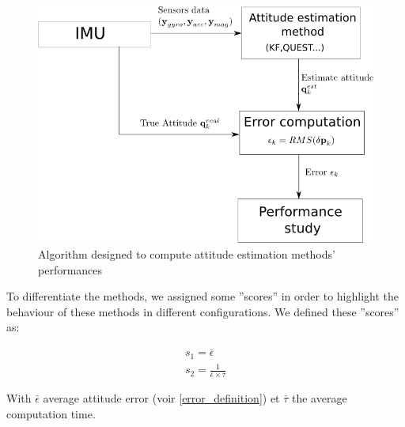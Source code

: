 \documentclass[conference]{IEEEtran}
\begin{document}
\begin{figure}[!h]
\centering
\includegraphics[scale=0.40]{images/test_method.png}
\caption{Algorithm designed to compute attitude estimation methods' performances}
\label{test_method}
\end{figure}


To differentiate the methods, we assigned  some ''scores'' in order to highlight the behaviour of these methods in different configurations. We defined these ''scores'' as:

\begin{align}
s_1 = \bar{\epsilon}\\
s_2 = \frac{1}{\bar{\epsilon} \times \bar{\tau}}
\label{score}
\end{align}

With $\bar{\epsilon}$ average attitude error (voir \ref{error_definition}) et $\bar{\tau}$ the average computation time. \\
\end{document}
